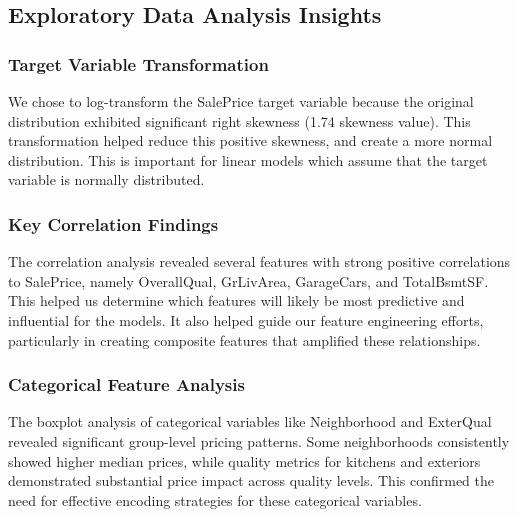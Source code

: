 \documentclass{article}
\begin{document}
\subsection{Exploratory Data Analysis Insights}

\subsubsection{Target Variable Transformation}
We chose to log-transform the SalePrice target variable because the original distribution exhibited significant right skewness (1.74 skewness value). This transformation helped reduce this positive skewness, and create a more normal distribution. This is important for linear models which assume that the target variable is normally distributed.

\subsubsection{Key Correlation Findings}
The correlation analysis revealed several features with strong positive correlations to SalePrice, namely OverallQual, GrLivArea, GarageCars, and TotalBsmtSF. This helped us determine which features will likely be most predictive and influential for the models. It also helped guide our feature engineering efforts, particularly in creating composite features that amplified these relationships.

\subsubsection{Categorical Feature Analysis}
The boxplot analysis of categorical variables like Neighborhood and ExterQual revealed significant group-level pricing patterns. Some neighborhoods consistently showed higher median prices, while quality metrics for kitchens and exteriors demonstrated substantial price impact across quality levels. This confirmed the need for effective encoding strategies for these categorical variables.
\end{document}
